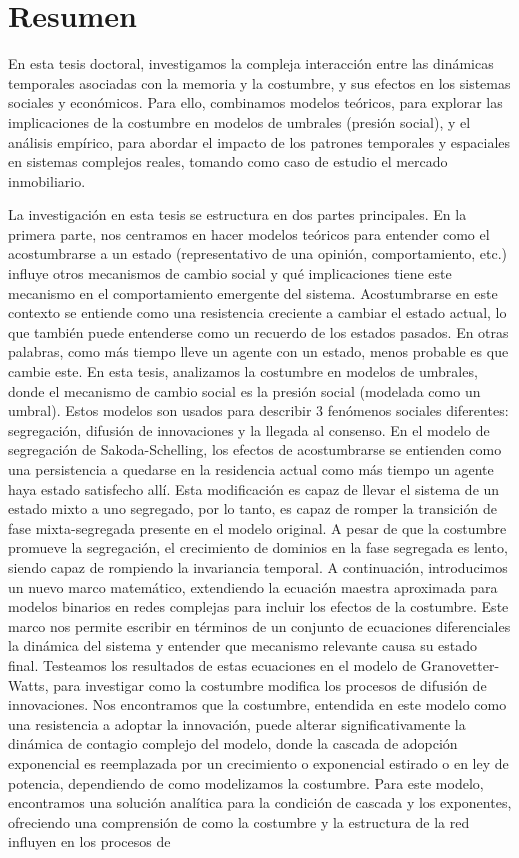 \pagebreak
\thispagestyle{empty}
\section*{Resumen}

En esta tesis doctoral, investigamos la compleja interacción entre las dinámicas temporales asociadas con la memoria y la costumbre, y sus efectos en los sistemas sociales y económicos. Para ello, combinamos modelos teóricos, para explorar las implicaciones de la costumbre en modelos de umbrales (presión social), y el análisis empírico, para abordar el impacto de los patrones temporales y espaciales en sistemas complejos reales, tomando como caso de estudio el mercado inmobiliario.

La investigación en esta tesis se estructura en dos partes principales. En la primera parte, nos centramos en hacer modelos teóricos para entender como el acostumbrarse a un estado (representativo de una opinión, comportamiento, etc.) influye otros mecanismos de cambio social y qué implicaciones tiene este mecanismo en el comportamiento emergente del sistema. Acostumbrarse en este contexto se entiende como una resistencia creciente a cambiar el estado actual, lo que también puede entenderse como un recuerdo de los estados pasados. En otras palabras, como más tiempo lleve un agente con un estado, menos probable es que cambie este. En esta tesis, analizamos la costumbre en modelos de umbrales, donde el mecanismo de cambio social es la presión social (modelada como un umbral). Estos modelos son usados para describir 3 fenómenos sociales diferentes: segregación, difusión de innovaciones y la llegada al consenso. En el modelo de segregación de Sakoda-Schelling, los efectos de acostumbrarse se entienden como una persistencia a quedarse en la residencia actual como más tiempo un agente haya estado satisfecho allí. Esta modificación es capaz de llevar el sistema de un estado mixto a uno segregado, por lo tanto, es capaz de romper la transición de fase mixta-segregada presente en el modelo original. A pesar de que la costumbre promueve la segregación, el crecimiento de dominios en la fase segregada es lento, siendo capaz de rompiendo la invariancia temporal. A continuación, introducimos un nuevo marco matemático, extendiendo la ecuación maestra aproximada para modelos binarios en redes complejas para incluir los efectos de la costumbre. Este marco nos permite escribir en términos de un conjunto de ecuaciones diferenciales la dinámica del sistema y entender que mecanismo relevante causa su estado final. Testeamos los resultados de estas ecuaciones en el modelo de Granovetter-Watts, para investigar como la costumbre modifica los procesos de difusión de innovaciones. Nos encontramos que la costumbre, entendida en este modelo como una resistencia a adoptar la innovación, puede alterar significativamente la dinámica de contagio complejo del modelo, donde la cascada de adopción exponencial es reemplazada por un crecimiento o exponencial estirado o en ley de potencia, dependiendo de como modelizamos la costumbre. Para este modelo, encontramos una solución analítica para la condición de cascada y los exponentes, ofreciendo una comprensión de como la costumbre y la estructura de la red influyen en los procesos de 